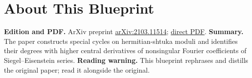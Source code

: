 

\chapter*{About This Blueprint}
\label{higher-siegel-weil-unitary-nonsingular-terms-about}

\textbf{Edition and PDF.} ArXiv preprint \href{https://arxiv.org/abs/2103.11514}{arXiv:2103.11514};
\href{https://arxiv.org/pdf/2103.11514}{direct PDF}.
\textbf{Summary.} The paper constructs special cycles on hermitian-shtuka moduli and identifies their degrees
with higher central derivatives of nonsingular Fourier coefficients of Siegel--Eisenstein series.
\textbf{Reading warning.} This blueprint rephrases and distills the original paper; read it alongside the original.

















